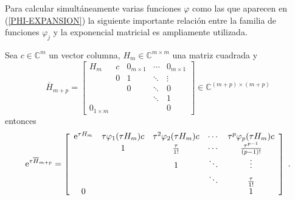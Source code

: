Para calcular simultáneamente varias funciones $\varphi$ como las que aparecen en (\ref{PHI-EXPANSION}) la siguiente importante relación entre la familia de funciones $\varphi_j$ y la exponencial matricial es ampliamente utilizada.
\begin{theorem}\label{theorem:exp-phi}
    \cite{sidje1998expokit} Sea $c\in\mathbb{C}^{m}$ un vector columna, $H_m\in\mathbb{C}^{m\times m}$ una matriz cuadrada y 
    \begin{equation}
    \overline{H}_{m+p} = \left[\begin{array}{ccccc}
    H_m & c & 0_{m \times 1} & \cdots & 0_{m \times 1} \\
          & 0 & 1 & \ddots & \vdots \\
          &   & 0 & \ddots & 0 \\
          &   &   & \ddots & 1 \\
       0_{1\times m}  &   &   &        & 0
    \end{array}\right]\in \mathbb{C}^{(m+p)\times(m+p)}
    \end{equation}
    entonces
     \begin{equation}
    \mathrm{e}^{\tau\overline{H}_{m+p}} = \left[\begin{array}{ccccc}
    \mathrm{e}^{\tau H_m} & \tau\varphi_1(\tau H_m)c & \tau^{2}\varphi_2(\tau H_m)c & \cdots & \tau^{p}\varphi_p(\tau H_m)c \\
      & 1 & \frac{\tau}{1!} & \cdots & \frac{\tau^{p-1}}{(p-1)!} \\
      &   & 1 & \ddots & \vdots \\
      &   &   & \ddots & \frac{\tau}{1!} \\
    0 &   &   &        & 1
    \end{array}\right]  \;.
    \end{equation}
\end{theorem}